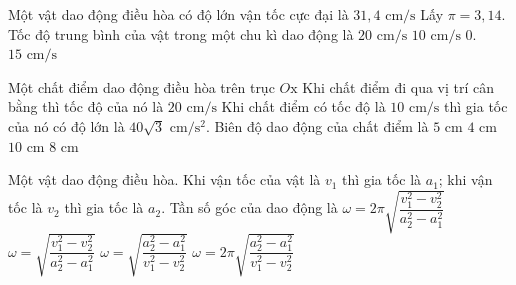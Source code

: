 \begin{ex}
	Một vật dao động điều hòa có độ lớn vận tốc cực đại là $31,4\text{ cm/s}\text{}$ Lấy $\pi =3,14.$ Tốc độ trung bình của vật trong một chu kì dao động là
	\choice
	{\True $20\text{ cm/s}\text{}$}
	{$10\text{ cm/s}\text{}$}
	{$0.$}
	{$15\text{ cm/s}\text{}$}
\end{ex}


\begin{ex}
	Một chất điểm dao động điều hòa trên trục $O\text{x}\text{}$ Khi chất điểm đi qua vị trí cân bằng thì tốc độ của nó là $20\text{ cm/s}\text{}$ Khi chất điểm có tốc độ là $10\text{ cm/s}$ thì gia tốc của nó có độ lớn là $40\sqrt{3}\text{ cm/}{{\text{s}}^{2}}.$ Biên độ dao động của chất điểm là
	\choice
	{\True $5\text{ cm}\text{}$}
	{$\text{4 cm}\text{}$}
	{$\text{10 cm}\text{}$}
	{$\text{8 cm}\text{}$}
\end{ex}

\begin{ex}
	Một vật dao động điều hòa. Khi vận tốc của vật là $v_1$ thì gia tốc là $a_1$; khi vận tốc là $v_2$ thì gia tốc là $a_2$. Tần số góc của dao động là
	\choice
	{$\omega=2\pi\sqrt{\dfrac{v_1^2-v_2^2}{a_2^2-a_1^2}}$}
	{$\omega=\sqrt{\dfrac{v_1^2-v_2^2}{a_2^2-a_1^2}}$}
	{\True $\omega=\sqrt{\dfrac{a_2^2-a_1^2}{v_1^2-v_2^2}}$}
	{$\omega=2\pi\sqrt{\dfrac{a_2^2-a_1^2}{v_1^2-v_2^2}}$}
\end{ex}

